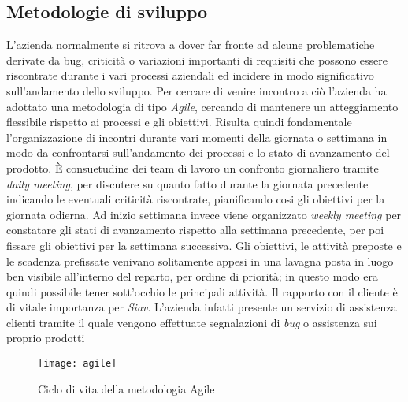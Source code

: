 \subsection{Metodologie di sviluppo}
L'azienda normalmente si ritrova a dover far fronte ad alcune problematiche derivate da bug, criticità o variazioni importanti di requisiti che possono essere riscontrate durante i vari processi aziendali ed incidere in modo significativo sull'andamento dello sviluppo.
Per cercare di venire incontro a ciò l'azienda ha adottato una metodologia di tipo \textit{Agile}, cercando di mantenere un atteggiamento flessibile rispetto ai processi e gli obiettivi. Risulta quindi fondamentale l'organizzazione di incontri durante vari momenti della giornata o settimana in modo da confrontarsi sull'andamento dei processi e lo stato di avanzamento del prodotto. È consuetudine dei team di lavoro un confronto giornaliero tramite \textit{daily meeting}, per discutere su quanto fatto durante la giornata precedente indicando le eventuali criticità riscontrate, pianificando cosi gli obiettivi per la giornata odierna. Ad inizio settimana invece viene organizzato \textit{weekly meeting} per constatare gli stati di avanzamento rispetto alla settimana precedente, per poi fissare gli obiettivi per la settimana successiva. Gli obiettivi, le attività preposte e le scadenza prefissate venivano solitamente appesi in una lavagna posta in luogo ben visibile all'interno del reparto, per ordine di priorità; in questo modo era quindi possibile tener sott'occhio le principali attività. Il rapporto con il cliente è di vitale importanza per \textit{Siav}. L'azienda infatti presente un servizio di assistenza clienti tramite il quale vengono effettuate segnalazioni di \textit{bug} o assistenza sui proprio prodotti 
\begin{figure}[!h] 
	\centering 
	\texttt{[image: agile]} 
	\caption{Ciclo di vita della metodologia Agile}
\end{figure}
